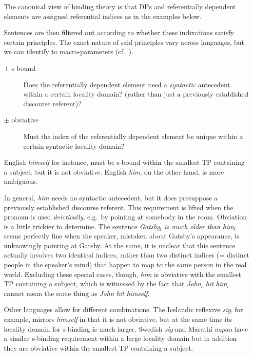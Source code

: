 The canonical view of binding theory is that DPs and referentially dependent elements are assigned referential indices as in the examples below.
%
\begin{exe}
    \ex
    \begin{xlist}
    \end{xlist}
\end{exe}
%
Sentences are then filtered out according to whether these indixations satisfy certain principles.
The exact nature of said principles vary across languages, but we can identify to macro-parameters (cf.\ \citealp{Kiparsky02, Kiparsky12}).
%
\begin{description}
    \item[$\pm$ s-bound] Does the referentially dependent element need a \emph{syntactic} antecedent within a certain locality domain? (rather than just a previously established discourse referent)?
    \item[$\pm$ obviative] Must the index of the referentially dependent element be unique within a certain syntactic locality domain?
\end{description}
%
English \emph{himself} for instance, must be s-bound within the smallest TP containing a subject, but it is not obviative.
English \emph{him}, on the other hand, is more ambiguous.

In general, \emph{him} needs no syntactic antecedent, but it does presuppose a previously established discourse referent.
This requirement is lifted when the pronoun is used \emph{deictically}, e.g.\ by pointing at somebody in the room.
Obviation is a little trickier to determine.
The sentence \emph{Gatsby$_i$ is much older than him$_i$} seems perfectly fine when the speaker, mistaken about Gatsby's appearance, is unknowingly pointing at Gatsby.
At the same, it is unclear that this sentence actually involves two identical indices, rather than two distinct indices (= distinct people in the speaker's mind) that happen to map to the same person in the real world.
Excluding these special cases, though, \emph{him} is obviative with the smallest TP containing a subject, which is witnessed by the fact that \emph{John$_i$ hit him$_i$} cannot mean the same thing as \emph{John hit himself}.

Other languages allow for different combinations.
The Icelandic reflexive \emph{sig}, for example, mirrors \emph{himself} in that it is not obviative, but at the same time its locality domain for s-binding is much larger.
Swedish \emph{sig} and Marathi \emph{aapan} have a similar s-binding requirement within a large locality domain but in addition they are obviative within the smallest TP containing a subject.

